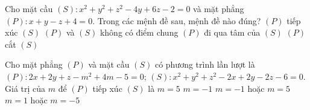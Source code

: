 \begin{ex}%
	Cho mặt cầu $(S): x^2+y^2+z^2-4y+6z-2=0$ và mặt phẳng $(P)\colon x+y-z+4=0$. Trong các mệnh đề sau, mệnh đề nào đúng?
	\choice
	{ $(P)$ tiếp xúc $(S)$}
	{\True $(P)$ và $(S)$ không có điểm chung}
	{$(P)$ đi qua tâm của $(S)$}
	{$(P)$ cắt $(S)$}
\end{ex}

\begin{ex}%
	Cho mặt phẳng $(P)$ và mặt cầu $(S)$ có phương trình lần lượt là $(P)\colon 2x+2y+z-m^2+4m-5=0$; $(S)\colon x^2+y^2+z^2-2x+2y-2z-6=0$. Giá trị của $m$ để $(P)$ tiếp xúc $(S)$ là
	\choice
	{$m=5$}
	{$m=-1$}
	{\True $m=-1$ hoặc $m=5$}
	{$m=1$ hoặc $m=-5$}
\end{ex}

